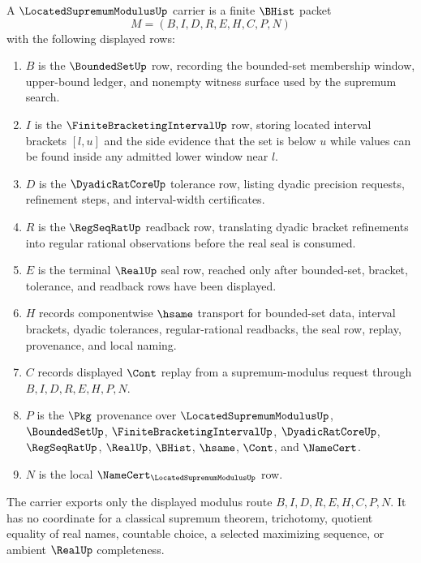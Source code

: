 \begin{definition}
\label{def:located-supremum-modulus-carrier}
A $\LocatedSupremumModulusUp$ carrier is a finite $\BHist$ packet
$$
M=(B,I,D,R,E,H,C,P,N)
$$
with the following displayed rows:
\begin{enumerate}
\item $B$ is the $\BoundedSetUp$ row, recording the bounded-set membership window, upper-bound ledger, and nonempty witness surface used by the supremum search.
\item $I$ is the $\FiniteBracketingIntervalUp$ row, storing located interval brackets $[l,u]$ and the side evidence that the set is below $u$ while values can be found inside any admitted lower window near $l$.
\item $D$ is the $\DyadicRatCoreUp$ tolerance row, listing dyadic precision requests, refinement steps, and interval-width certificates.
\item $R$ is the $\RegSeqRatUp$ readback row, translating dyadic bracket refinements into regular rational observations before the real seal is consumed.
\item $E$ is the terminal $\RealUp$ seal row, reached only after bounded-set, bracket, tolerance, and readback rows have been displayed.
\item $H$ records componentwise $\hsame$ transport for bounded-set data, interval brackets, dyadic tolerances, regular-rational readbacks, the seal row, replay, provenance, and local naming.
\item $C$ records displayed $\Cont$ replay from a supremum-modulus request through $B,I,D,R,E,H,P,N$.
\item $P$ is the $\Pkg$ provenance over $\LocatedSupremumModulusUp$, $\BoundedSetUp$, $\FiniteBracketingIntervalUp$, $\DyadicRatCoreUp$, $\RegSeqRatUp$, $\RealUp$, $\BHist$, $\hsame$, $\Cont$, and $\NameCert$.
\item $N$ is the local $\NameCert_{\LocatedSupremumModulusUp}$ row.
\end{enumerate}
The carrier exports only the displayed modulus route $B,I,D,R,E,H,C,P,N$. It has no coordinate for a classical supremum theorem, trichotomy, quotient equality of real names, countable choice, a selected maximizing sequence, or ambient $\RealUp$ completeness.
\end{definition}

